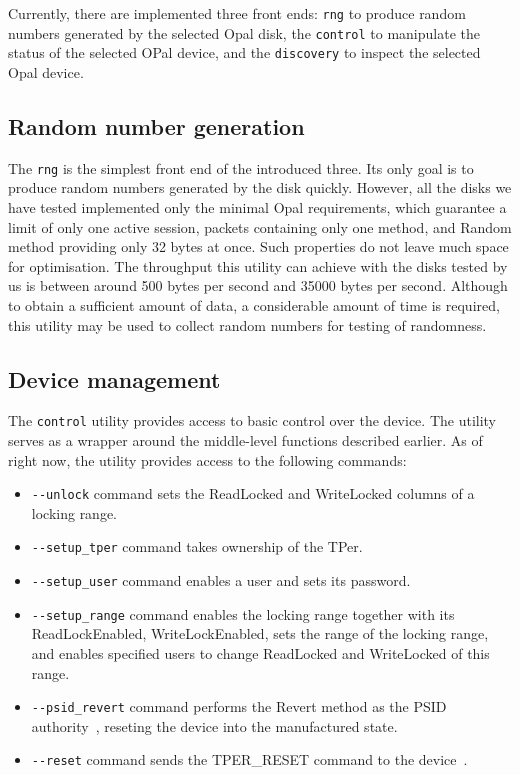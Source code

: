 Currently, there are implemented three front ends: \verb|rng| to produce random numbers generated by the selected Opal disk, the \verb|control| to manipulate the status of the selected OPal device, and the \verb|discovery| to inspect the selected Opal device.

\subsection{Random number generation}

The \verb|rng| is the simplest front end of the introduced three. Its only goal is to produce random numbers generated by the disk quickly. However, all the disks we have tested implemented only the minimal Opal requirements, which guarantee a limit of only one active session, packets containing only one method, and Random method providing only 32 bytes at once. Such properties do not leave much space for optimisation. The throughput this utility can achieve with the disks tested by us is between around 500 bytes per second and 35000 bytes per second. Although to obtain a sufficient amount of data, a considerable amount of time is required, this utility may be used to collect random numbers for testing of randomness. 

\subsection{Device management}

The \verb|control| utility provides access to basic control over the device.
The utility serves as a wrapper around the middle-level functions described earlier.
As of right now, the utility provides access to the following commands:

\begin{itemize}
    \item \verb|--unlock| command sets the ReadLocked and WriteLocked columns of a locking range.
    \item \verb|--setup_tper| command takes ownership of the TPer.
    \item \verb|--setup_user| command enables a user and sets its password.
    \item \verb|--setup_range| command enables the locking range together with its ReadLockEnabled, WriteLockEnabled, sets the range of the locking range, and enables specified users to change ReadLocked and WriteLocked of this range.
    \item \verb|--psid_revert| command performs the Revert method as the PSID authority~\cite{tcg-psid}, reseting the device into the manufactured state.
    \item \verb|--reset| command sends the TPER\_RESET command to the device~\cite{tcg-storage-core}.
\end{itemize}

